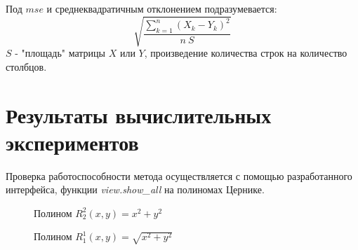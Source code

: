 \documentclass[oneside, final, 14pt]{article}
\begin{document}
Под $mse$ и среднеквадратичным отклонением подразумевается:
$$\sqrt{\frac{\sum \limits_{k=1}^{n} (X_k - Y_k)^2 }{n~S}}$$
$S$ - "площадь" матрицы $X$ или $Y$, произведение количества строк на количество столбцов.

\section{Результаты вычислительных экспериментов}
Проверка работоспособности метода осуществляется с помощью разработанного интерфейса, функции \textit{view.show\_all} на полиномах Цернике.

\begin{figure}[h]
\caption{Полином $R_2^2(x,y) = x^2 + y^2$}
\end{figure}

\begin{figure}
\caption{Полином $R_1^1(x,y) = \sqrt{x^2 + y^2}$}
\end{figure}
\end{document}
